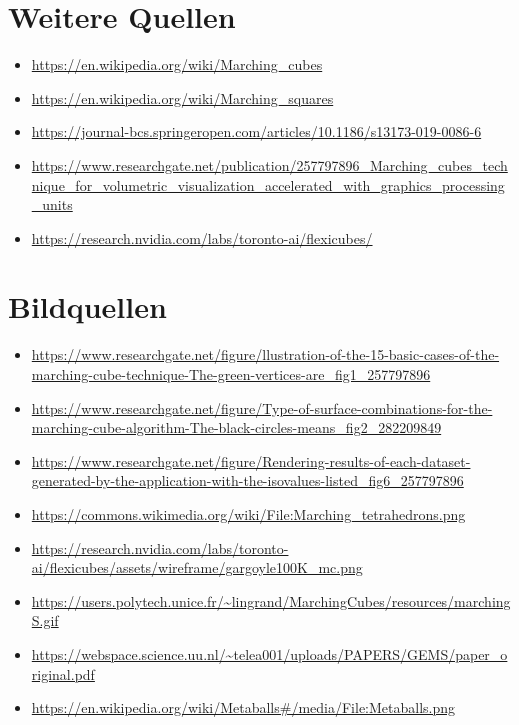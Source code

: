 \documentclass[12pt]{article}
\begin{document}
\section*{Weitere Quellen}
\begin{itemize}
  \item \url{https://en.wikipedia.org/wiki/Marching_cubes}
  \item \url{https://en.wikipedia.org/wiki/Marching_squares}
  \item \url{https://journal-bcs.springeropen.com/articles/10.1186/s13173-019-0086-6}
  \item \url{https://www.researchgate.net/publication/257797896_Marching_cubes_technique_for_volumetric_visualization_accelerated_with_graphics_processing_units}
  \item \url{https://research.nvidia.com/labs/toronto-ai/flexicubes/}
\end{itemize}

\section*{Bildquellen}
\begin{itemize}
  \item \url{https://www.researchgate.net/figure/llustration-of-the-15-basic-cases-of-the-marching-cube-technique-The-green-vertices-are_fig1_257797896}
  \item \url{https://www.researchgate.net/figure/Type-of-surface-combinations-for-the-marching-cube-algorithm-The-black-circles-means_fig2_282209849}
  \item \url{https://www.researchgate.net/figure/Rendering-results-of-each-dataset-generated-by-the-application-with-the-isovalues-listed_fig6_257797896}
  \item \url{https://commons.wikimedia.org/wiki/File:Marching_tetrahedrons.png}
  \item \url{https://research.nvidia.com/labs/toronto-ai/flexicubes/assets/wireframe/gargoyle100K_mc.png}
  \item \url{https://users.polytech.unice.fr/~lingrand/MarchingCubes/resources/marchingS.gif}
  \item \url{https://webspace.science.uu.nl/~telea001/uploads/PAPERS/GEMS/paper_original.pdf}
  \item \url{https://en.wikipedia.org/wiki/Metaballs#/media/File:Metaballs.png}
\end{itemize}
\end{document}
